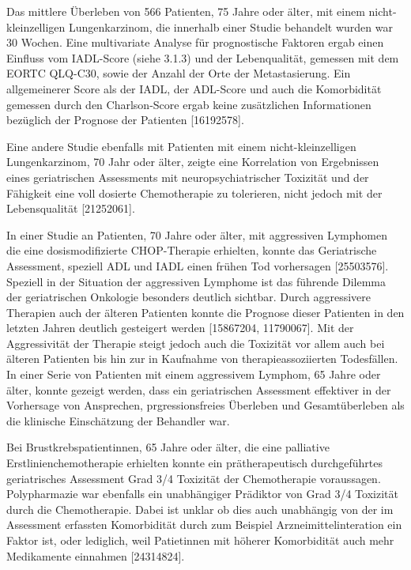Das mittlere Überleben von 566 Patienten, 75 Jahre oder älter, mit einem nicht-kleinzelligen Lungenkarzinom, die innerhalb einer Studie behandelt wurden war 30 Wochen. Eine multivariate Analyse für prognostische Faktoren ergab einen Einfluss vom IADL-Score (siehe 3.1.3) und der Lebenqualität, gemessen mit dem EORTC QLQ-C30, sowie der Anzahl der Orte der Metastasierung. Ein allgemeinerer Score als der IADL, der ADL-Score und auch die Komorbidität gemessen durch den Charlson-Score ergab keine zusätzlichen Informationen bezüglich der Prognose der Patienten [16192578].

Eine andere Studie ebenfalls mit Patienten mit einem nicht-kleinzelligen Lungenkarzinom, 70 Jahr oder älter, zeigte eine Korrelation von Ergebnissen eines geriatrischen Assessments mit neuropsychiatrischer Toxizität und der Fähigkeit eine voll dosierte Chemotherapie zu tolerieren, nicht jedoch mit der Lebensqualität [21252061].

In einer Studie an Patienten, 70 Jahre oder älter, mit aggressiven Lymphomen die eine dosismodifizierte CHOP-Therapie erhielten, konnte das Geriatrische Assessment, speziell ADL und IADL einen frühen Tod vorhersagen [25503576]. Speziell in der Situation der aggressiven Lymphome ist das führende Dilemma der geriatrischen Onkologie besonders deutlich sichtbar. Durch aggressivere Therapien auch der älteren Patienten konnte die Prognose dieser Patienten in den letzten Jahren deutlich gesteigert werden [15867204, 11790067]. Mit der Aggressivität der Therapie steigt jedoch auch die Toxizität vor allem auch bei älteren Patienten bis hin zur in Kaufnahme von therapieassoziierten Todesfällen. In einer Serie von Patienten mit einem aggressivem Lymphom, 65 Jahre oder älter, konnte gezeigt werden, dass ein geriatrischen Assessment effektiver in der Vorhersage von Ansprechen, prgressionsfreies Überleben und Gesamtüberleben als die klinische Einschätzung der Behandler war.

Bei Brustkrebspatientinnen, 65 Jahre oder älter, die eine palliative Erstlinienchemotherapie erhielten konnte ein prätherapeutisch durchgeführtes geriatrisches Assessment Grad 3/4 Toxizität der Chemotherapie voraussagen. Polypharmazie war ebenfalls ein unabhängiger Prädiktor von Grad 3/4 Toxizität durch die Chemotherapie. Dabei ist unklar ob dies auch unabhängig von der im Assessment erfassten Komorbidität durch zum Beispiel Arzneimittelinteration ein Faktor ist, oder lediglich, weil Patietinnen mit höherer Komorbidität auch mehr Medikamente einnahmen [24314824].

